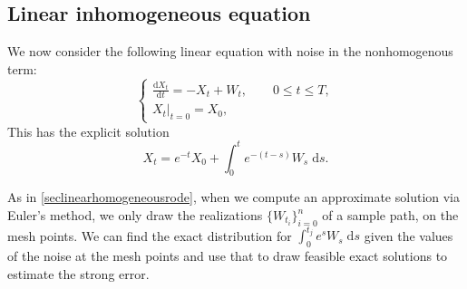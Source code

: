 \documentclass[reqno,12pt]{amsart}
\theoremstyle{plain}%
\theoremstyle{definition}
\begin{document}
\subsection{Linear inhomogeneous equation}


We now consider the following linear equation with noise in the nonhomogenous term:
\begin{equation}
    \label{linearnonhomogeneousrode}
    \begin{cases}
        \displaystyle \frac{\mathrm{d}X_t}{\mathrm{d} t} = -X_t + W_t, \qquad 0 \leq t \leq T, \\
        \left. X_t \right|_{t = 0} = X_0,
      \end{cases}
\end{equation}
This has the explicit solution
\begin{equation}
    X_t = e^{-t}X_0 + \int_0^t e^{-(t-s)}W_s\;\mathrm{d}s.
\end{equation}

As in \cref{seclinearhomogeneousrode}, when we compute an approximate solution via Euler's method, we only draw the realizations $\{W_{t_i}\}_{i=0}^n$ of a sample path, on the mesh points. We can find the exact distribution for $\int_0^{t_j} e^{s} W_s\;\mathrm{d}s$ given the values of the noise at the mesh points and use that to draw feasible exact solutions to estimate the strong error.
\end{document}
